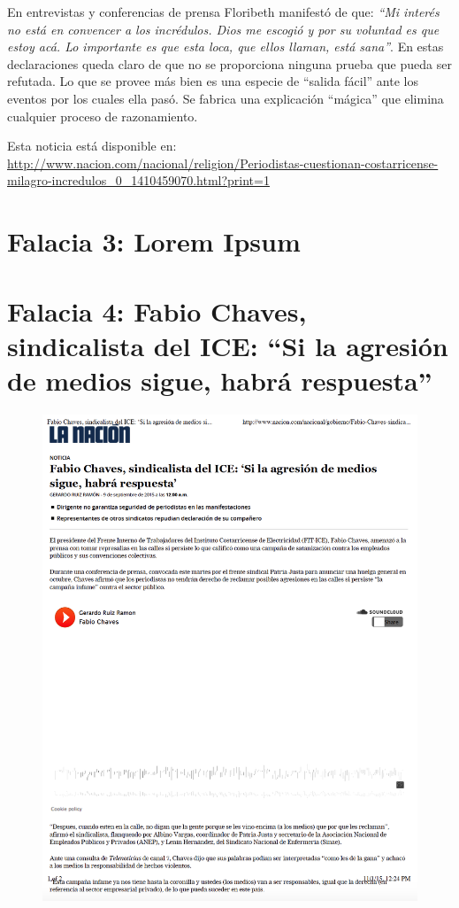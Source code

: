 \documentclass[times]{simauth}
\begin{document}
En entrevistas y conferencias de prensa Floribeth manifestó de que: \textit{``Mi interés no está en convencer a los incrédulos. Dios me escogió y por su voluntad es que estoy acá. Lo importante es que esta loca, que ellos llaman, está sana''}. En estas declaraciones queda claro de que no se proporciona ninguna prueba que pueda ser refutada. Lo que se provee más bien es una especie de ``salida fácil'' ante los eventos por los cuales ella pasó. Se fabrica una explicación ``mágica'' que elimina cualquier proceso de razonamiento.

Esta noticia está disponible en:  \href{http://www.nacion.com/nacional/religion/Periodistas-cuestionan-costarricense-milagro-incredulos_0_1410459070.html?print=1}{http://www.nacion.com/nacional/religion/Periodistas-cuestionan-costarricense-milagro-incredulos\_0\_1410459070.html?print=1}


\section{Falacia 3: Lorem Ipsum}

\newpage
\section{Falacia 4: Fabio Chaves, sindicalista del ICE: ``Si la agresión de medios sigue, habrá respuesta''}

\begin{figure}[h!]
    \centering
    \includegraphics[width=15cm]{fabio-chaves-1}
    \label{fig:falacia2}
\end{figure}
\end{document}
